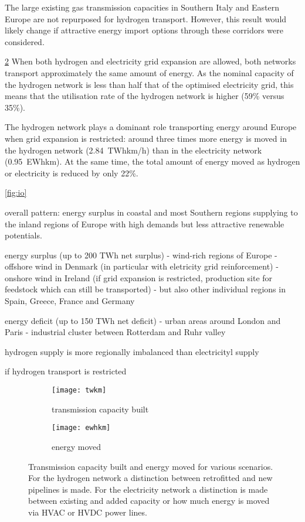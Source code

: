 The large existing gas transmission capacities in Southern Italy and Eastern
Europe are not repurposed for hydrogen transport. However, this result would
likely change if attractive energy import options through these corridors were
considered.


\cref{fig:network-stats:ewhkm}
When both hydrogen and electricity grid expansion are allowed, both networks
transport approximately the same amount of energy. As the nominal capacity of
the hydrogen network is less than half that of the optimised electricity grid,
this means that the utilisation rate of the hydrogen network is higher (59\%
versus 35\%).

The hydrogen network plays a dominant role transporting energy around Europe
when grid expansion is restricted: around three times more energy is moved in
the hydrogen network (2.84~TWhkm/h) than in the electricity network
(0.95~EWhkm). At the same time, the total amount of energy moved as hydrogen or
electricity is reduced by only 22\%.


\cref{fig:io}

overall pattern: energy surplus in coastal and most Southern regions supplying
to the inland regions of Europe with high demands but less attractive renewable potentials.

energy surplus (up to 200 TWh net surplus)
- wind-rich regions of Europe
- offshore wind in Denmark (in particular with eletricity grid reinforcement)
- onshore wind in Ireland (if grid expansion is restricted, production site for feedstock which can still be transported)
- but also other individual regions in Spain, Greece, France and Germany

energy deficit (up to 150 TWh net deficit)
- urban areas around London and Paris
- industrial cluster between Rotterdam and Ruhr valley

hydrogen supply is more regionally imbalanced than electricityl supply

if hydrogen transport is restricted

\begin{figure}
    \centering
    \begin{subfigure}[t]{0.49\textwidth}
        \centering
        \caption{transmission capacity built}
        \texttt{[image: twkm]}
        \label{fig:network-stats:twkm}
    \end{subfigure}
    \begin{subfigure}[t]{0.49\textwidth}
        \centering
        \caption{energy moved}
        \texttt{[image: ewhkm]}
        \label{fig:network-stats:ewhkm}
    \end{subfigure}
    \caption{Transmission capacity built and energy moved for various scenarios.
        For the hydrogen network a distinction between retrofitted and new pipelines is made.
        For the electricity network a distinction is made between existing and added capacity
        or how much energy is moved via HVAC or HVDC power lines.}
    \label{fig:network-stats}
\end{figure}

